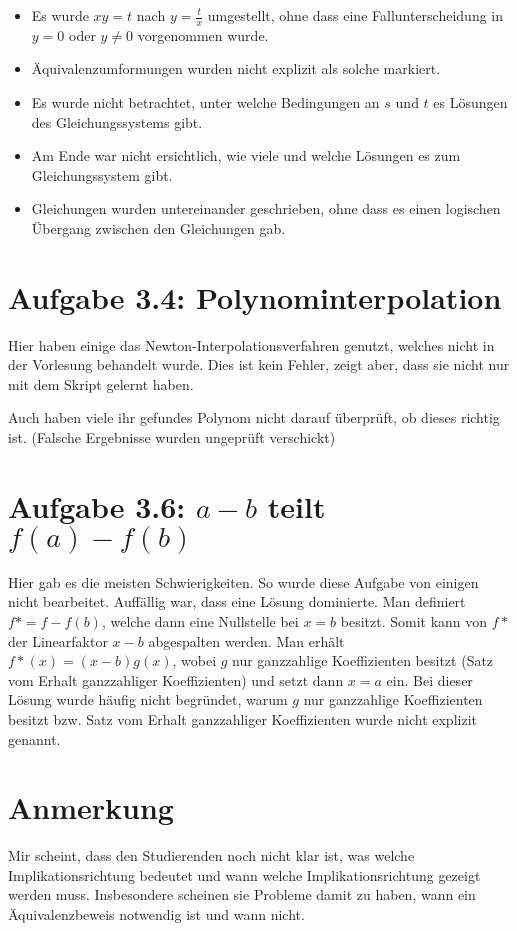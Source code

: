 \documentclass[a4paper]{article}
\begin{document}
\begin{itemize}
  \item Es wurde $xy=t$ nach $y=\frac tx$ umgestellt, ohne dass eine Fallunterscheidung in $y=0$ oder $y\neq 0$ vorgenommen wurde.
  \item Äquivalenzumformungen wurden nicht explizit als solche markiert.
  \item Es wurde nicht betrachtet, unter welche Bedingungen an $s$ und $t$ es Lösungen des Gleichungssystems gibt.
  \item Am Ende war nicht ersichtlich, wie viele und welche Lösungen es zum Gleichungssystem gibt.
  \item Gleichungen wurden untereinander geschrieben, ohne dass es einen logischen Übergang zwischen den Gleichungen gab.
\end{itemize}

\section{Aufgabe 3.4: Polynominterpolation}

Hier haben einige das Newton-Interpolationsverfahren genutzt, welches nicht in der Vorlesung behandelt wurde. Dies ist kein Fehler, zeigt aber, dass sie nicht nur mit dem Skript gelernt haben.

Auch haben viele ihr gefundes Polynom nicht darauf überprüft, ob dieses richtig ist. (Falsche Ergebnisse wurden ungeprüft verschickt)

\section{Aufgabe 3.6: $a-b$ teilt $f(a)-f(b)$}

Hier gab es die meisten Schwierigkeiten. So wurde diese Aufgabe von einigen nicht bearbeitet. Auffällig war, dass eine Lösung dominierte. Man definiert $f* = f - f(b)$, welche dann eine Nullstelle bei $x=b$ besitzt. Somit kann von $f*$ der Linearfaktor $x-b$ abgespalten werden. Man erhält $f*(x) = (x-b) g(x)$, wobei $g$ nur ganzzahlige Koeffizienten besitzt (Satz vom Erhalt ganzzahliger Koeffizienten) und setzt dann $x=a$ ein. Bei dieser Lösung wurde häufig nicht begründet, warum $g$ nur ganzzahlige Koeffizienten besitzt bzw. Satz vom Erhalt ganzzahliger Koeffizienten wurde nicht explizit genannt.

\section{Anmerkung}

Mir scheint, dass den Studierenden noch nicht klar ist, was welche Implikationsrichtung bedeutet und wann welche Implikationsrichtung gezeigt werden muss. Insbesondere scheinen sie Probleme damit zu haben, wann ein Äquivalenzbeweis notwendig ist und wann nicht.
\end{document}
